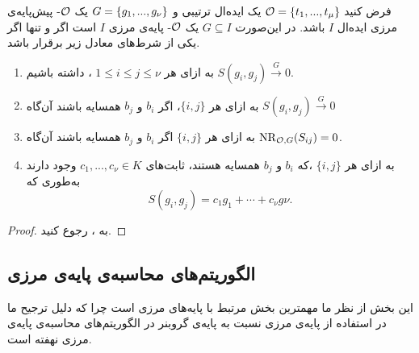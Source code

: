 \begin{theorem}
	\label{buchberger criterion for border basis}
فرض کنید 
${\mathcal O} = \{t_{1},...,t_{\mu}\}$
یک ایده‌ال ترتیبی و 
$G = \{g_{1},...,g_{\nu}\}$
یک 
${\mathcal O}$-
پیش‌پایه‌ی مرزی ایده‌ال 
$I$
باشد. در این‌صورت 
$G\subseteq I$
یک 
${\mathcal O}$-
پایه‌ی مرزی 
$I$
است اگر و تنها اگر یکی از شرط‌های معادل زیر برقرار باشد.
\begin{enumerate}
\item
به ازای هر 
$1\leq i\leq j\leq \nu$
،
داشته باشیم 
$S(g_{i}, g_{j})\xrightarrow{G}0$.
\item
به ازای هر 
$\{i,j\}$،
اگر 
$b_{i}$
و
$b_{j}$
همسایه باشند آن‌گاه 
$S(g_{i}, g_{j})\xrightarrow{G}0$
\item
به ازای هر 
$\{i, j\}$
اگر 
$b_{i}$
و
$b_{j}$
همسایه باشند آن‌گاه 
$\operatorname{\mathrm{NR}}_{{\mathcal O}, G}(S_{ij}) = 0$.
\item
به ازای هر 
$\{i, j\}$
،که 
$b_{i}$
و
$b_{j}$
همسایه هستند، ثابت‌های 
$c_{1},...,c_{\nu}\in K$
وجود دارند به‌طوری که
$$S(g_{i},g_{j}) = c_{1}g_{1} + \cdots + c_{\nu}g{\nu}.$$
\end{enumerate}
\end{theorem}
\begin{proof}
به 
{\small \cite[ص.۴۳۸]{cca2_kreuzer}}
، رجوع کنید.
\end{proof}

\subsection*{الگوریتم‌های محاسبه‌ی پایه‌ی مرزی}
این بخش از نظر ما مهمترین بخش مرتبط با پایه‌های مرزی است چرا که دلیل ترجیح ما در استفاده از پایه‌ی مرزی نسبت به پایه‌ی گروبنر در الگوریتم‌های محاسبه‌ی پایه‌ی مرزی نهفته است.

